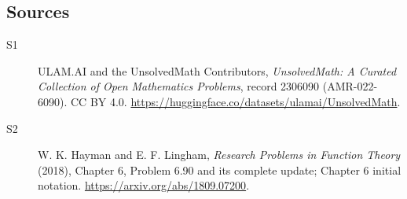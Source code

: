 \documentclass[11pt]{article}
\begin{document}
\subsection{Sources}
\begin{description}
\item[\hypertarget{source:2306090:1}{S1}] ULAM.AI and the UnsolvedMath Contributors, \emph{UnsolvedMath: A Curated Collection of Open Mathematics Problems}, record 2306090 (AMR-022-6090). CC BY 4.0. \url{https://huggingface.co/datasets/ulamai/UnsolvedMath}.
\item[\hypertarget{source:2306090:2}{S2}] W. K. Hayman and E. F. Lingham, \emph{Research Problems in Function Theory} (2018), Chapter 6, Problem 6.90 and its complete update; Chapter 6 initial notation. \url{https://arxiv.org/abs/1809.07200}.
\end{description}
\label{end:2306090}
\end{document}
